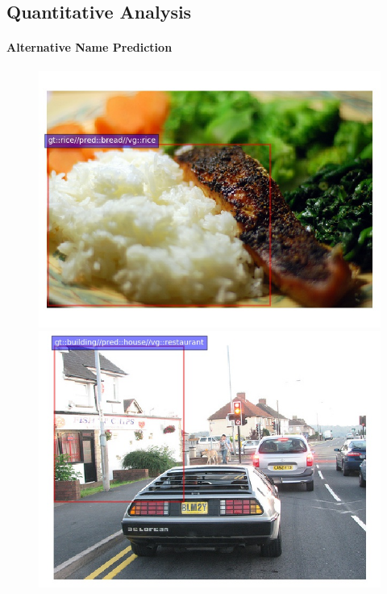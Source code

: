\subsection{Quantitative Analysis}
\label{sect:exp_analysis}


\paragraph{Alternative Name Prediction}
\begin{figure}
	\centering
	\includegraphics[scale=.2]{images/2323938.jpg}
	\includegraphics[scale=.2]{images/2322259.jpg}

\end{figure}
